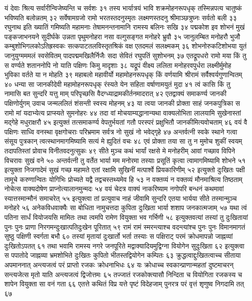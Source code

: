 यं देवाः श्रित्य सर्वारीन्विजेष्यन्ति च सर्वशः ३१
तस्य भार्यात्रयं भावि शक्रमोहनरूपधृक्
तस्मिन्नपत्य चातुष्कं भविष्यति बलोन्नतम् ३२
सर्वेषामग्रजो रामो भरतस्तदनुस्मृतः
लक्ष्मणस्तदनु श्रीमाञ्छत्रुघ्नः सर्वतो बली ३३
रघुनाथ इति ख्यातिं गमिष्यति महामनाः
तेषामनन्तनामानि रामस्य बलिनः सखि ३४
पद्मकोश इव शोभनं मुखं
पङ्कजाभनयने सुदीर्घके
उन्नता पृथुमनोहरा नसा
वल्गुसङ्गत मनोहरे भ्रुवौ ३५
जानुलम्बित मनोहरौ भुजौ
कम्बुशोभिगलकोऽतिह्रस्वकः
सत्कपाटतलविस्तृतश्रिकं
वक्ष एतदमलं सलक्ष्मकम् ३६
शोभनोरुकटिशोभया युतं
जानुयुग्मममलं स्वसेवितम्
पादपद्ममखिलैर्निजैः सदा
सेवितं रघुपतिं सुशोभनम् ३७
एतद्रूपधरो रामो मया किं तु स वर्ण्यते
शताननोपि नो याति पक्षिणः किमु मादृशाः ३८
यद्रूपं वीक्ष्य ललिता मनोहरवपुर्धरा
लक्ष्मीर्मुमोह भुविका वर्तते या न मोहति ३९
महाबलो महावीर्यो महामोहनरूपधृक्
किं वर्णयामि श्रीरामं सर्वैश्वर्यगुणान्वितम् ४०
धन्या सा जानकीदेवी महामोहनरूपधृक्
रंस्यते येन सहिता वर्षाणामयुतं मुदा ४१
त्वं कासि किं तु नामासि बत सुन्दरि यत्तु माम्
परिपृच्छसि वैदग्ध्याद्रामकीर्तनमादरात् ४२
एतद्वाक्यं समाकर्ण्य जानकी पक्षिणोर्युगम्
उवाच जन्मललितं शंसन्ती स्वस्य मोहनम् ४३
या त्वया जानकी प्रोक्ता साहं जनकपुत्रिका
स रामो मां यदाभ्येत्य प्राप्स्यते सुमनोहरः ४४
तदा वां मोचयाम्यद्धानान्यथा वाक्यलोभिता
लालयामि सुखेनास्तां मद्गेहे मधुराक्षरौ ४५
इत्युक्तं तत्समाकर्ण्य वेपतुर्भयतां गतौ
परस्परं प्रक्षुभितौ जानकीमित्यवोचताम् ४६
वयं वै पक्षिणः साध्वि वनस्था वृक्षगोचराः
परिभ्रमाम सर्वत्र नो सुखं नो भवेद्गृहे ४७
अन्तर्वत्नी स्वके स्थाने गत्वा संसूय पुत्रकान्
त्वत्स्थानमागमिष्यामि सत्यं मे ह्युदितं वचः ४८
एवं प्रोक्ता तया सा तु न मुमोच शुकीं स्वयम्
तदापतिस्तां प्रोवाच विनीतवदनुत्सुकः ४९
सीते मुञ्च कथं भार्यां रक्षसे मे मनोहरीम्
आवां गच्छाव विपिने विचरावः सुखं वने ५०
अन्तर्वत्नी तु वर्तेत भार्या मम मनोरमा
तस्याः प्रसूतिं कृत्वा त्वामागमिष्यामि शोभने ५१
इत्युक्ता निजगादेमं सुखं गच्छ महामते
एतां रक्षामि सुखिनीं मत्पार्श्वे प्रियकारिणीम् ५२
इत्युक्तो दुःखितः पक्षी तामूचे करुणान्वितः
योगिभिः प्रोच्यते यद्वै तद्वचस्तथ्यमेव हि ५३
न वक्तव्यं न वक्तव्यं मौनमाश्रित्य तिष्ठताम्
नोचेत्स वाक्यदोषेण प्राप्नोत्यालानमुन्मदः ५४
वयं चेदत्र वाक्यं नाकरिष्याम नगोपरि
बन्धनं कथमावां स्यात्तस्मान्मौनं समाचरेत् ५५
इत्युक्त्वा तां प्रत्युवाच नाहं जीवामि सुन्दरि
एतया भार्यया सीते तस्मान्मुञ्च मनोहरे ५६
अनेकविधवाक्यैः सा बोधिता नामुचत्तदा
कुपिता दुःखिता भार्या शशाप जनकात्मजाम् ५७
यथा त्वं पतिना सार्धं वियोजयसि मामितः
तथा त्वमपि रामेण वियुक्ता भव गर्भिणी ५८
इत्युक्तवत्यां तस्यां तु दुःखितायां पुनः पुनः
प्राणा निरगमन्दुःखात्पतिदुःखेन पूरितात् ५९
रामं रामं स्मरन्त्याश्च वदन्त्यांश्च पुनः पुनः
विमानमागतं सुष्ठु पक्षिणी स्वर्गता बभौ ६०
तस्यां मृतायां दुःखार्तो भर्ता तस्याः स पक्षिराट्
परमं क्रोधमापन्नो जाह्नव्यां दुःखितोऽपतत् ६१
तथा भवामि रामस्य नगरे जनपूरिते
मद्वाक्यादियमुद्विग्ना वियोगेन सुदुःखिता ६२
इत्युक्त्वा स पपातोदे जाह्नव्या भ्रमशोभिते
दुःखितः कुपितो भीतस्तद्वियोगेन कम्पितः ६३
क्रुद्धत्वाद्दुःखितत्वाच्च सीताया अपमाननात्
अन्त्यजत्वं परं प्राप्तो रजकः क्रोधनाभिधः ६४
यः क्रोधाच्च स्वकान्प्राणान्महतां दुष्टमाचरन्
सन्त्यजेत्स मृतो याति अन्त्यजत्वं द्विजोत्तमः ६५
तज्जातं रजकोक्त्यासौ निन्दिता च वियोगिता
रजकस्य च शापेन वियुक्ता सा वनं गता ६६
एतत्ते कथितं विप्र यत्ते पृष्टं विदेहजाम्
पुनरत्र परं वृत्तं शृणुष्व निगदामि तत् ६७


